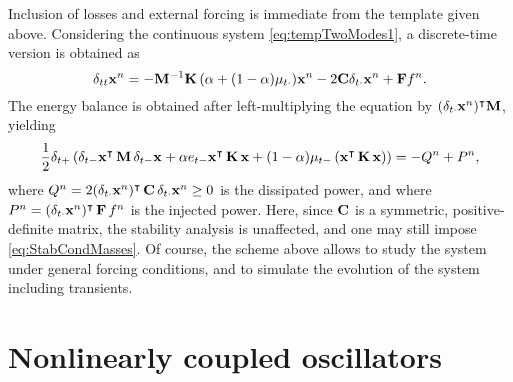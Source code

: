 \documentclass[11pt,twoside,a4paper,english]{book}
\newcommand{\etm}{e_{t-}}
\newcommand{\dtp}{\delta_{t+}}
\newcommand{\dtm}{\delta_{t-}}
\newcommand{\dtd}{\delta_{t\cdot}}
\newcommand{\dtt}{\delta_{tt}}
\newcommand{\mtm}{\mu_{t-}}
\newcommand{\mtd}{\mu_{t\cdot}}
\begin{document}
Inclusion of losses and external forcing is immediate from the template given above. Considering the continuous system \eqref{eq:tempTwoModes1}, a discrete-time version is obtained as
\begin{equation}
\dtt {\bf x}^n = -{\bf M}^{-1}{\bf K}\, (\alpha + (1-\alpha)\mtd) {\bf x}^n - 2{\bf C}\dtd {\bf x}^n + {\bf F} f^n.
\end{equation}
The energy balance is obtained after left-multiplying the equation by $(\dtd {\bf x}^n)^\intercal{\bf M}$, yielding
\begin{equation}
\frac{1}{2}\dtp \left( \dtm {\bf x}^{\intercal}\,{\bf M}\, \dtm {\bf x} + \alpha \etm {\bf x}^{\intercal}\,{\bf K}\,  {\bf x} + (1-\alpha)\mtm \left({\bf x}^{\intercal}\,{\bf K}\,  {\bf x}\right)  \right)   = -Q^n+P^n,
\end{equation}
where $Q^n = 2(\dtd {\bf x}^n)^\intercal \, {\bf C} \, \dtd {\bf x}^n \geq 0$ is the dissipated power, and where $P^n = ({\dtd {\bf x}^n})^\intercal \, {\bf F} \, f^n$ is the injected power. 
Here, since ${\bf C}$ is a symmetric, positive-definite matrix, the stability analysis is unaffected, and one may still impose \eqref{eq:StabCondMasses}. Of course, the scheme above allows to study the system under general forcing conditions, and to simulate the evolution of the system including transients. 


\section{Nonlinearly coupled oscillators}
\end{document}
